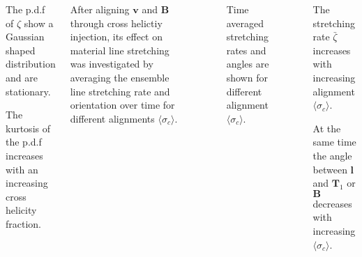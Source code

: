 \documentclass[20pt, a0paper, portrait, margin=15mm, innermargin=15mm,
     blockverticalspace=15mm, colspace=15mm, subcolspace=8mm]{tikzposter} %
\newcommand{\va}[1]{\bm{#1}}
\newcommand{\plot}[3]{
\begin{figure}[H]
    \centering
    \scriptsize
    \scalebox{1.3}{}
    \caption{\footnotesize{#2}}
    \label{#3}
\end{figure}
}
\begin{document}
\begin{columns}
{\begin{minipage}[t]{20cm}
                    \begin{itemsposter}
                        \item The p.d.f of $\zeta $ show
                              a Gaussian shaped distribution and are stationary.

                        \vspace{0.5cm}

                        \item The kurtosis of the p.d.f increases with an increasing
                              cross helicity fraction.
                    \end{itemsposter}



                     After aligning $\va{v}$ and $\va{B}$ through cross helictiy
                     injection, its effect on material line stretching was
                     investigated by averaging the ensemble line stretching
                     rate and orientation over time for different alignments $\langle
                     \sigma_c \rangle $.

                    \plot{figures/line_xhel_scaling_128}
						{Time averaged stretching rates and angles are shown for
                        different alignment $\langle \sigma_c \rangle$.}
						{xhel_scaling}

                    \begin{itemsposter}
                        \item The stretching rate $\bar{\zeta}$ increases with
                            increasing alignment $\langle \sigma_c \rangle$.

                        \vspace{0.5cm}

                    \item At the same time the angle between $\va{l}$ and
                        $\va{T}_1$ or $\va{B}$ decreases with
                            increasing $\langle \sigma_c \rangle$.

                    \end{itemsposter}

                
            \end{minipage}
         
        }
	
	\end{columns}
	
\end{document}
